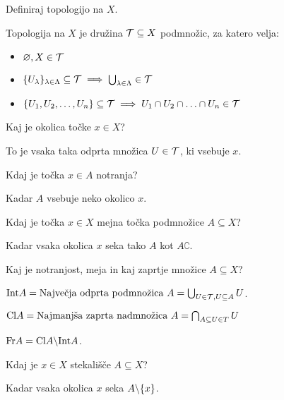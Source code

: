 \begin{vo}{Definiraj topologijo na $X$.}

Topologija na $X$ je družina $\mathcal{T} \subseteq X$ podmnožic, za katero velja:
\begin{itemize}
  \item $\varnothing, X \in \mathcal{T}$
  \item $\{U_\lambda\}_{\lambda \in \Lambda} \subseteq \mathcal{T}
	\implies \bigcup_{\lambda \in \Lambda} \in \mathcal{T}$
  \item $\{ {U}_1 , {U}_2 , \ldots , {U}_{n} \} \subseteq \mathcal{T}
	\implies {U}_1 \cap {U}_2 \cap \ldots \cap {U}_{n} \in \mathcal{T}$
\end{itemize}

\end{vo}

\begin{vo}{Kaj je okolica točke $x \in X$?}

To je vsaka taka odprta množica $U \in \mathcal{T}$, ki vsebuje $x$.

\end{vo}

\begin{vo}{Kdaj je točka $x \in A$ notranja?}

Kadar $A$ vsebuje neko okolico $x$.

\end{vo}

\begin{vo}{Kdaj je točka $x \in X$ mejna točka podmnožice
  $A \subseteq X$?}

Kadar vsaka okolica $x$ seka tako $A$ kot $A\complement$.

\end{vo}

\begin{vo}{Kaj je notranjost, meja in kaj zaprtje množice
  $A \subseteq X$?}

$\text{Int} A = \text{Največja odprta podmnožica $A$} =
\bigcup_{U \in \mathcal{T}, U \subseteq A} U$.

$\text{Cl} A = \text{Najmanjša zaprta nadmnožica $A$} =
\bigcap_{A \subseteq U \in T} U$

$\text{Fr} A = \text{Cl} A \backslash \text{Int} A$.

\end{vo}

\begin{vo}{Kdaj je $x \in X$ stekališče $A \subseteq X$?}

Kadar vsaka okolica $x$ seka $A \backslash \{x\}$.

\end{vo}

